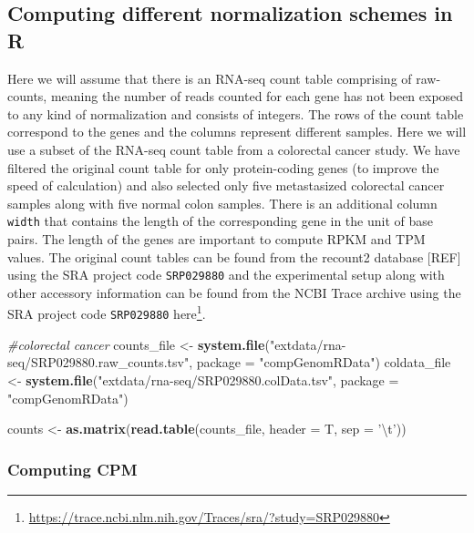 \documentclass[12pt,]{krantz}
\newenvironment{Shaded}{\begin{snugshade}}{\end{snugshade}}
\newcommand{\CharTok}[1]{\textcolor[rgb]{0.31,0.60,0.02}{#1}}
\newcommand{\CommentTok}[1]{\textcolor[rgb]{0.56,0.35,0.01}{\textit{#1}}}
\newcommand{\DataTypeTok}[1]{\textcolor[rgb]{0.13,0.29,0.53}{#1}}
\newcommand{\KeywordTok}[1]{\textcolor[rgb]{0.13,0.29,0.53}{\textbf{#1}}}
\newcommand{\NormalTok}[1]{#1}
\newcommand{\StringTok}[1]{\textcolor[rgb]{0.31,0.60,0.02}{#1}}
\renewcommand{\href}[2]{#2\footnote{\url{#1}}}
\begin{document}
\hypertarget{computing-different-normalization-schemes-in-r}{%
\subsection{Computing different normalization schemes in R}\label{computing-different-normalization-schemes-in-r}}

Here we will assume that there is an RNA-seq count table comprising of raw-counts, meaning the number of reads counted for each gene has not been exposed to any kind of normalization and consists of integers. The rows of the count table correspond to the genes and the columns represent different samples. Here we will use a subset of the RNA-seq count table from a colorectal cancer study. We have filtered the original count table for only protein-coding genes (to improve the speed of calculation) and also selected only five metastasized colorectal cancer samples along with five normal colon samples. There is an additional column \texttt{width} that contains the length of the corresponding gene in the unit of base pairs. The length of the genes are important to compute RPKM and TPM values. The original count tables can be found from the recount2 database {[}REF{]} using the SRA project code \texttt{SRP029880} and the experimental setup along with other accessory information can be found from the NCBI Trace archive using the SRA project code \texttt{SRP029880} \href{https://trace.ncbi.nlm.nih.gov/Traces/sra/?study=SRP029880}{here}.

\begin{Shaded}
\begin{Highlighting}[]
\CommentTok{#colorectal cancer}
\NormalTok{counts_file <-}\StringTok{ }\KeywordTok{system.file}\NormalTok{(}\StringTok{"extdata/rna-seq/SRP029880.raw_counts.tsv"}\NormalTok{, }\DataTypeTok{package =} \StringTok{"compGenomRData"}\NormalTok{)}
\NormalTok{coldata_file <-}\StringTok{ }\KeywordTok{system.file}\NormalTok{(}\StringTok{"extdata/rna-seq/SRP029880.colData.tsv"}\NormalTok{, }\DataTypeTok{package =} \StringTok{"compGenomRData"}\NormalTok{)}

\NormalTok{counts <-}\StringTok{ }\KeywordTok{as.matrix}\NormalTok{(}\KeywordTok{read.table}\NormalTok{(counts_file, }\DataTypeTok{header =}\NormalTok{ T, }\DataTypeTok{sep =} \StringTok{'}\CharTok{\textbackslash{}t}\StringTok{'}\NormalTok{))}
\end{Highlighting}
\end{Shaded}

\hypertarget{computing-cpm}{%
\subsubsection{Computing CPM}\label{computing-cpm}}
\end{document}
